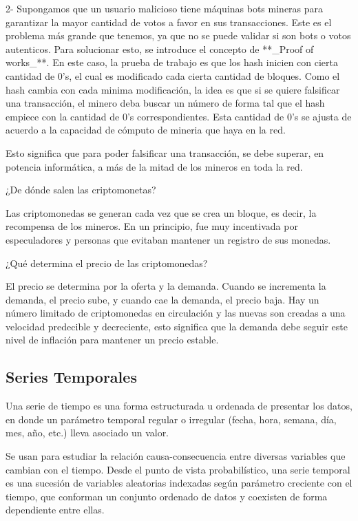 \documentclass[a4paper,10pt]{article}
\begin{document}
 2- Supongamos que un usuario malicioso tiene máquinas bots mineras para garantizar la mayor cantidad de votos a favor en sus transacciones. Este es el problema más grande que tenemos, ya que no se puede validar si son bots o votos autenticos. Para solucionar esto, se introduce el concepto de **\_Proof of works\_**. En este caso, la prueba de trabajo es que los hash inicien con cierta cantidad de 0's, el cual es modificado cada cierta cantidad de bloques.
Como el hash cambia con cada minima modificación, la idea es que si se quiere falsificar una transacción, el minero deba buscar un número de forma tal que el hash empiece con la cantidad de 0's correspondientes. Esta cantidad de 0's se ajusta de acuerdo a la capacidad de cómputo de mineria que haya en la red.

Esto significa que para poder falsificar una transacción, se debe superar, en potencia informática, a más de la mitad de los mineros en toda la red.

 ¿De dónde salen las criptomonetas?

 Las criptomonedas se generan cada vez que se crea un bloque, es decir, la recompensa de los mineros. En un principio, fue muy incentivada por especuladores y personas que evitaban mantener un registro de sus monedas.

 ¿Qué determina el precio de las criptomonedas?

 El precio se determina por la oferta y la demanda. Cuando se incrementa la demanda, el precio sube, y cuando cae la demanda, el precio baja. Hay un número limitado de criptomonedas en circulación y las nuevas son creadas a una velocidad predecible y decreciente, esto significa que la demanda debe seguir este nivel de inflación para mantener un precio estable.

\bigskip

\bigskip

\subsection{Series Temporales}

Una serie de tiempo es una forma estructurada u ordenada de presentar los datos, en donde un parámetro temporal regular o irregular (fecha, hora, semana, día, mes, año, etc.) lleva asociado un valor.

Se usan para estudiar la relación causa-consecuencia entre diversas variables que cambian con el tiempo. Desde el punto de vista probabilístico, una serie temporal es una sucesión de variables aleatorias indexadas según parámetro creciente con el tiempo, que conforman un conjunto ordenado de datos y coexisten de forma dependiente entre ellas.
\end{document}

